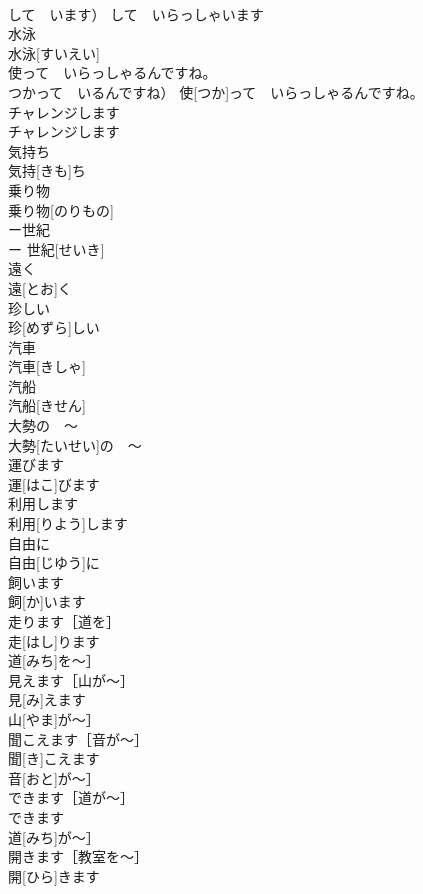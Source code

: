 \documentclass[8pt]{extreport}
\begin{document}
\begin{CJK}{UTF8}{min}
\\	して　います）	して　いらっしゃいます	
\\	水泳	
\\	水泳[すいえい]	
\\	使って　いらっしゃるんですね。	
\\	つかって　いるんですね）	使[つか]って　いらっしゃるんですね。	
\\	チャレンジします	
\\	チャレンジします	
\\	気持ち	
\\	気持[きも]ち	
\\	乗り物	
\\	乗り物[のりもの]	
\\	ー世紀	
\\	ー 世紀[せいき]	
\\	遠く	
\\	遠[とお]く	
\\	珍しい	
\\	珍[めずら]しい	
\\	汽車	
\\	汽車[きしゃ]	
\\	汽船	
\\	汽船[きせん]	
\\	大勢の　〜	
\\	大勢[たいせい]の　〜	
\\	運びます	
\\	運[はこ]びます	
\\	利用します	
\\	利用[りよう]します	
\\	自由に	
\\	自由[じゆう]に	
\\	飼います	
\\	飼[か]います	
\\	走ります［道を］	
\\	走[はし]ります
\\	道[みち]を〜］	
\\	見えます［山が〜］	
\\	見[み]えます
\\	山[やま]が〜］	
\\	聞こえます［音が〜］	
\\	聞[き]こえます
\\	音[おと]が〜］	
\\	できます［道が〜］	
\\	できます
\\	道[みち]が〜］	
\\	開きます［教室を〜］	
\\	開[ひら]きます

\end{CJK}
\end{document}
